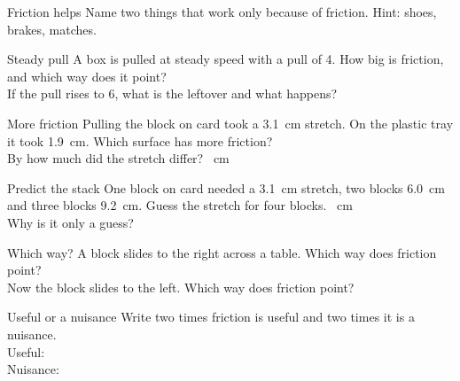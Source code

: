 \begin{puzzle}{Friction helps}
Name two things that work only because of friction. Hint: shoes, brakes, matches. \wline[5cm]
\end{puzzle}

\begin{puzzle}{Steady pull}
A box is pulled at steady speed with a pull of 4. How big is friction, and which way does it point? \wline[4cm]\\
If the pull rises to 6, what is the leftover and what happens? \wline[4cm]
\end{puzzle}
\clearpage

\begin{puzzle}{More friction}
Pulling the block on card took a 3.1~cm stretch. On the plastic tray it took 1.9~cm. Which surface has more friction? \wline[2cm]\\
By how much did the stretch differ? \wline[2cm]~cm
\end{puzzle}

\begin{puzzle}{Predict the stack}
One block on card needed a 3.1~cm stretch, two blocks 6.0~cm and three blocks 9.2~cm. Guess the stretch for four blocks. \wline[2cm]~cm\\
Why is it only a guess? \wline[4cm]
\end{puzzle}

\begin{puzzle}{Which way?}
A block slides to the right across a table. Which way does friction point? \wline[2cm]\\
Now the block slides to the left. Which way does friction point? \wline[2cm]
\end{puzzle}

\begin{puzzle}{Useful or a nuisance}
Write two times friction is useful and two times it is a nuisance.\\
Useful: \wline[9cm]\\[6pt]
Nuisance: \wline[9cm]
\end{puzzle}
\clearpage
